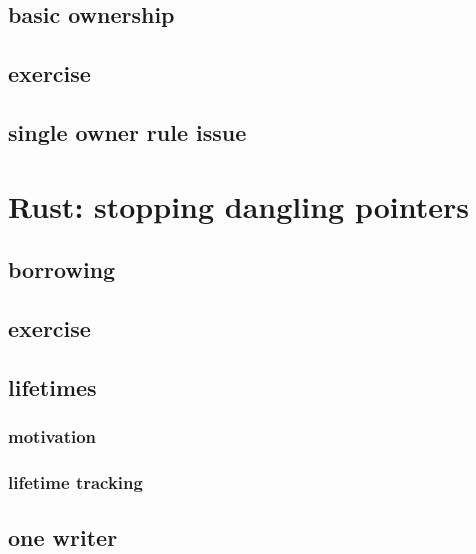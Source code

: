 \subsection{basic ownership}


\subsection{exercise}


\subsection{single owner rule issue}


\section{Rust: stopping dangling pointers}


\subsection{borrowing}


\subsection{exercise}



\subsection{lifetimes}
\subsubsection{motivation}


\subsubsection{lifetime tracking}


\subsection{one writer}



